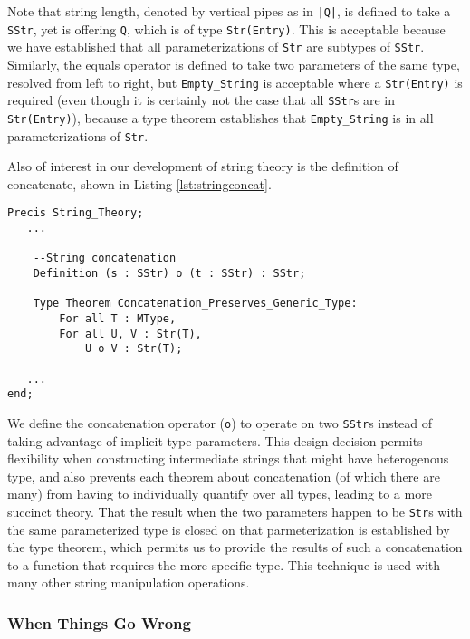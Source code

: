 Note that string length, denoted by vertical pipes as in \texttt{|Q|}, is defined to take a \texttt{SStr}, yet is offering \texttt{Q}, which is of type \texttt{Str(Entry)}.  This is acceptable because we have established that all parameterizations of \texttt{Str} are subtypes of \texttt{SStr}.  Similarly, the equals operator is defined to take two parameters of the same type, resolved from left to right, but \texttt{Empty\_String} is acceptable where a \texttt{Str(Entry)} is required (even though it is certainly not the case that all \texttt{SStr}s are in \texttt{Str(Entry)}), because a type theorem establishes that \texttt{Empty\_String} is in all parameterizations of \texttt{Str}.

Also of interest in our development of string theory is the definition of concatenate, shown in Listing \ref{lst:stringconcat}.

\begin{lstlisting}[float=h,language=resolve,caption={String concatenation and an associated type theorem\label{lst:stringconcat}}]
Precis String_Theory;
   ...

	--String concatenation
	Definition (s : SStr) o (t : SStr) : SStr;

	Type Theorem Concatenation_Preserves_Generic_Type:
		For all T : MType,
		For all U, V : Str(T),
			U o V : Str(T);

   ...
end;
\end{lstlisting}

We define the concatenation operator (\texttt{o}) to operate on two \texttt{SStr}s instead of taking advantage of implicit type parameters.  This design decision permits flexibility when constructing intermediate strings that might have heterogenous type, and also prevents each theorem about concatenation (of which there are many) from having to individually quantify over all types, leading to a more succinct theory.  That the result when the two parameters happen to be \texttt{Str}s with the same parameterized type is closed on that parmeterization is established by the type theorem, which permits us to provide the results of such a concatenation to a function that requires the more specific type.  This technique is used with many other string manipulation operations.

		\subsubsection{When Things Go Wrong}	%


